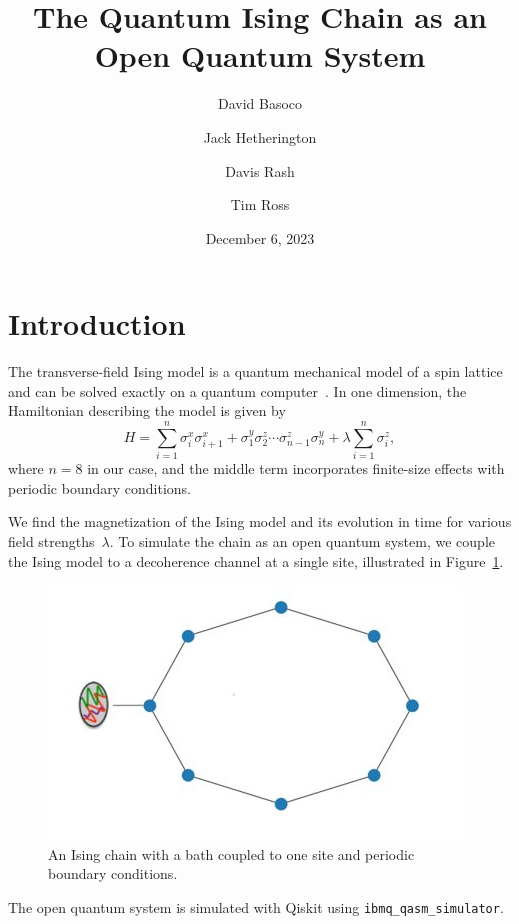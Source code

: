 \documentclass[12pt, twocolumn]{article}
\title{The Quantum Ising Chain as an Open Quantum System}
\author{David Basoco \and Jack Hetherington \and Davis Rash \and Tim Ross}
\date{December 6, 2023}
\begin{document}
  \maketitle

  \section{Introduction}
  The transverse-field Ising model is a quantum mechanical model of a spin lattice and can be solved exactly on a quantum computer~\cite{CerveraLierta18}. In one dimension, the Hamiltonian describing the model is given by
  \begin{equation}
    \label{eq:system-hamiltonian}
    H = \sum_{i = 1}^{n} \sigma_{i}^{x} \sigma_{i + 1}^{x}
        + \sigma_{1}^{y} \sigma_{2}^{z} \dotsm \sigma_{n - 1}^{z} \sigma_{n}^{y}
        + \lambda \sum_{i = 1}^{n} \sigma_{i}^{z},
  \end{equation}
  where \( n = 8 \) in our case, and the middle term incorporates finite-size effects with periodic boundary conditions.

  We find the magnetization of the Ising model and its evolution in time for various field strengths~\( \lambda \). To simulate the chain as an open quantum system, we couple the Ising model to a decoherence channel at a single site, illustrated in Figure~\ref{fig:ising-chain-with-environment}.
  \begin{figure}
    \centering
    \includegraphics[width=\linewidth]{images/ising_chain_with_environment.png}
    \caption{An Ising chain with a bath coupled to one site and periodic boundary conditions.%
      \label{fig:ising-chain-with-environment}}
  \end{figure}
  The open quantum system is simulated with Qiskit using \texttt{ibmq\_qasm\_simulator}.
\end{document}
